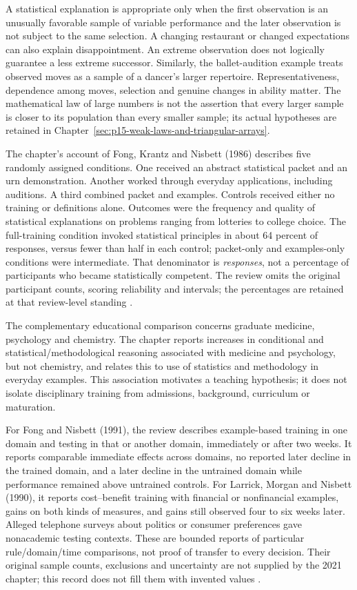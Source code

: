 A statistical explanation is appropriate only when the first observation
is an unusually favorable sample of variable performance and the later
observation is not subject to the same selection. A changing restaurant
or changed expectations can also explain disappointment. An extreme
observation does not logically guarantee a less extreme successor.
Similarly, the ballet-audition example treats observed moves as a sample
of a dancer's larger repertoire. Representativeness, dependence among
moves, selection and genuine changes in ability matter. The mathematical
law of large numbers is not the assertion that every larger sample is
closer to its population than every smaller sample; its actual hypotheses
are retained in Chapter~\ref{sec:p15-weak-laws-and-triangular-arrays}.

The chapter's account of Fong, Krantz and Nisbett (1986) describes five
randomly assigned conditions. One received an abstract statistical packet
and an urn demonstration. Another worked through everyday applications,
including auditions. A third combined packet and examples. Controls
received either no training or definitions alone. Outcomes were the
frequency and quality of statistical explanations on problems ranging
from lotteries to college choice. The full-training condition invoked
statistical principles in about 64 percent of responses, versus fewer
than half in each control; packet-only and examples-only conditions were
intermediate. That denominator is \emph{responses}, not a percentage
of participants who became statistically competent. The review omits
the original participant counts, scoring reliability and intervals;
the percentages are retained at that review-level standing
\cite[p.~804]{DeOliveiraNisbett2021Improve}.

The complementary educational comparison concerns graduate medicine,
psychology and chemistry. The chapter reports increases in conditional
and statistical/methodological reasoning associated with medicine and
psychology, but not chemistry, and relates this to use of statistics and
methodology in everyday examples. This association motivates a teaching
hypothesis; it does not isolate disciplinary training from admissions,
background, curriculum or maturation.

For Fong and Nisbett (1991), the review describes example-based training
in one domain and testing in that or another domain, immediately or after
two weeks. It reports comparable immediate effects across domains, no
reported later decline in the trained domain, and a later decline in the
untrained domain while performance remained above untrained controls.
For Larrick, Morgan and Nisbett (1990), it reports cost--benefit training
with financial or nonfinancial examples, gains on both kinds of measures,
and gains still observed four to six weeks later. Alleged telephone
surveys about politics or consumer preferences gave nonacademic testing
contexts. These are bounded reports of particular rule/domain/time
comparisons, not proof of transfer to every decision. Their original
sample counts, exclusions and uncertainty are not supplied by the 2021
chapter; this record does not fill them with invented values
\cite[p.~804]{DeOliveiraNisbett2021Improve}.

